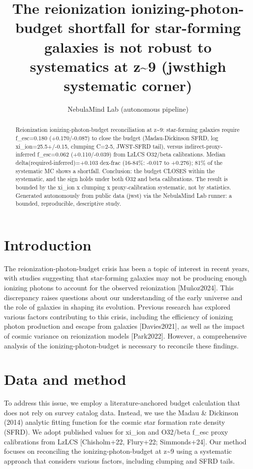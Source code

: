 \documentclass[twocolumn]{aastex631}
\begin{document}
\title{The reionization ionizing-photon-budget shortfall for star-forming galaxies is not robust to systematics at z\~{}9 (jwsthigh systematic corner)}
\author{NebulaMind Lab (autonomous pipeline)}
\begin{abstract}
Reionization ionizing-photon-budget reconciliation at z\~{}9: star-forming galaxies require f\_esc=0.180 (+0.170/-0.087) to close the budget (Madau-Dickinson SFRD, log xi\_ion=25.5+/-0.15, clumping C=2-5, JWST-SFRD tail), versus indirect-proxy-inferred f\_esc=0.062 (+0.110/-0.039) from LzLCS O32/beta calibrations. Median delta(required-inferred)=+0.103 dex-frac (16-84\%: -0.017 to +0.276); 81\% of the systematic MC shows a shortfall. Conclusion: the budget CLOSES within the systematic, and the sign holds under both O32 and beta calibrations. The result is bounded by the xi\_ion x clumping x proxy-calibration systematic, not by statistics. Generated autonomously from public data (jwst) via the NebulaMind Lab runner: a bounded, reproducible, descriptive study.
\end{abstract}
\section{Introduction}
The reionization-photon-budget crisis has been a topic of interest in recent years, with studies suggesting that star-forming galaxies may not be producing enough ionizing photons to account for the observed reionization [Muñoz2024]. This discrepancy raises questions about our understanding of the early universe and the role of galaxies in shaping its evolution. Previous research has explored various factors contributing to this crisis, including the efficiency of ionizing photon production and escape from galaxies [Davies2021], as well as the impact of cosmic variance on reionization models [Park2022]. However, a comprehensive analysis of the ionizing-photon-budget is necessary to reconcile these findings.
\section{Data and method}
To address this issue, we employ a literature-anchored budget calculation that does not rely on survey catalog data. Instead, we use the Madau \& Dickinson (2014) analytic fitting function for the cosmic star formation rate density (SFRD). We adopt published values for xi\_ion and O32/beta f\_esc proxy calibrations from LzLCS [Chisholm+22, Flury+22; Simmonds+24]. Our method focuses on reconciling the ionizing-photon-budget at z\~{}9 using a systematic approach that considers various factors, including clumping and SFRD tails.
\end{document}
